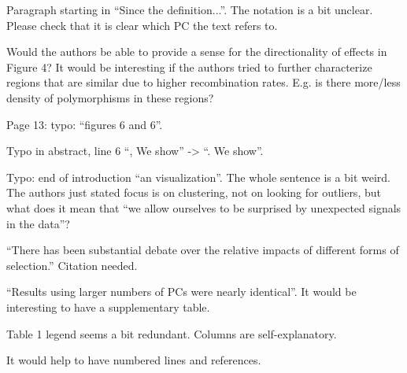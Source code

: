 \begin{point}{}
Paragraph starting in ``Since the definition...''. The notation is a bit unclear. Please check that it
is clear which PC the text refers to.
\end{point}

\begin{point}{}
Would the authors be able to provide a sense for the directionality of effects in Figure 4? It
would be interesting if the authors tried to further characterize regions that are similar due to
higher recombination rates. E.g. is there more/less density of polymorphisms in these regions?
\end{point}

\begin{point}{Page 13:}
typo: ``figures 6 and 6''.
\end{point}

\begin{point}{}
Typo in abstract, line 6 ``, We show'' -> ``. We show''.
\end{point}

\begin{point}{}
Typo: end of introduction ``an visualization''. The whole sentence is a bit weird. The authors just
stated focus is on clustering, not on looking for outliers, but what does it mean that ``we allow
ourselves to be surprised by unexpected signals in the data''?
\end{point}

\begin{point}{}
``There has been substantial debate over the relative impacts of different forms of selection.''
Citation needed.
\end{point}

\begin{point}{}
``Results using larger numbers of PCs were nearly identical''. It would be interesting to have a
supplementary table.
\end{point}

\begin{point}{}
Table 1 legend seems a bit redundant. Columns are self-explanatory.
\end{point}

\begin{point}{}
It would help to have numbered lines and references.
\end{point}

